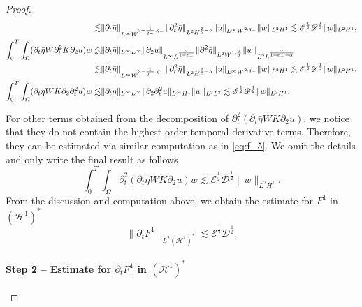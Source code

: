 \documentclass[10pt,a4paper]{amsart}
\def\p{\partial}
\begin{document}
\begin{proof}
\begin{align}{\label{eq:f_5}}
\begin{aligned}
					\lesssim &\|\p_{t}\bar{\eta}\|_{L^{\infty}W^{3-\frac{1}{q_{-}},q_{-}}}\|\p_{t}^{2}\bar{\eta}\|_{L^{2}H^{\frac{3}{2}-\alpha}}\|u\|_{L^{\infty}W^{2,q_{-}}}\|w\|_{L^{2}H^{1}}\lesssim\mathscr{E}^{\frac{1}{2}}\mathscr{D}^{\frac{1}{2}}\|w\|_{L^{2}H^{1}},\\
					\int_{0}^{T}\int_{\Omega}(\p_{t}\bar{\eta}W\p_{t}^{2}K\p_{2}u)w\lesssim&\|\p_{t}\bar{\eta}\|_{L^{\infty}L^{\infty}}\|\p_{2}u\|_{L^{\infty}L^{\frac{2}{1-\varepsilon_{-}}}}\|\p_{t}^{2}\bar{\eta}\|_{L^{2}W^{1,\frac{2}{\alpha}}}\|w\|_{L^{2}L^{\frac{2}{1+\varepsilon_{-}-\alpha}}}\\
					\lesssim &\|\p_{t}\bar{\eta}\|_{L^{\infty}W^{3-\frac{1}{q_{-}},q_{-}}}\|\p_{t}^{2}\bar{\eta}\|_{L^{2}H^{\frac{3}{2}-\alpha}}\|u\|_{L^{\infty}W^{2,q_{-}}}\|w\|_{L^{2}H^{1}}\lesssim \mathscr{E}^{\frac{1}{2}}\mathscr{D}^{\frac{1}{2}}\|w\|_{L^{2}H^{1}},\\
					\int_{0}^{T}\int_{\Omega}(\p_{t}\bar{\eta}WK\p_{2}\p_{t}^{2}u)w\lesssim&\|\p_{t}\bar{\eta}\|_{L^{\infty}L^{\infty}}\|\p_{2}\p_{t}^{2}u\|_{L^{\infty}H^{1}}\|w\|_{L^{2}L^{2}}\lesssim \mathscr{E}^{\frac{1}{2}}\mathscr{D}^{\frac{1}{2}}\|w\|_{L^{2}H^{1}}.
				\end{aligned}
			\end{align}
			
			\noindent For other terms obtained from the decomposition of $\p_{t}^{2}(\p_{t}\bar{\eta}WK\p_{2}u)$, we notice that they do not contain the highest-order temporal derivative terms. Therefore, they can be estimated via similar computation as in \eqref{eq:f_5}. We omit the details and only write the final result as follows
			\[
			\int_{0}^{T}\int_{\Omega}\p_{t}^{2}(\p_{t}\bar{\eta}WK\p_{2}u)w\lesssim \mathscr{E}^{\frac{1}{2}}\mathscr{D}^{\frac{1}{2}}\|w\|_{L^{2}H^{1}}.
			\]
			From the discussion and computation above, we obtain the estimate for $F^{1}$ in $(\mathcal{H}^1)^{*}$
			\[
			\|\p_{t}F^{1}\|_{L^{2}(\mathcal{H}^1)^{*}}\lesssim \mathscr{E}^{\frac{1}{2}}\mathscr{D}^{\frac{1}{2}}.
			\]
			
			\paragraph{\underline{Step 2 -- Estimate for $\p_{t}F^{4}$ in $(\mathcal{H}^1)^{*}$}} 
			

\end{proof}
\end{document}
